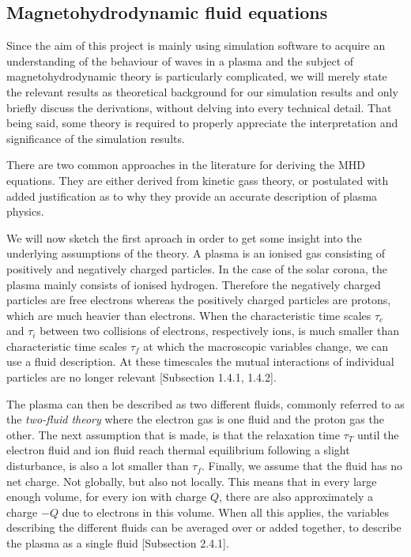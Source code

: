 \subsection{Magnetohydrodynamic fluid equations}
Since the aim of this project is mainly using simulation software to acquire an understanding of the behaviour of waves in a plasma and the subject of magnetohydrodynamic theory is particularly complicated,
we will merely state the relevant results as theoretical background for our simulation results and only briefly discuss the derivations, without delving into every technical detail.
That being said, some theory is required to properly appreciate the interpretation and significance of the simulation results.

There are two common approaches in the literature for deriving the MHD equations. They are either derived from kinetic gass theory, or postulated with added justification as to why they provide an accurate description of plasma physics.

We will now sketch the first aproach in order to get some insight into the underlying assumptions of the theory.
A plasma is an ionised gas consisting of positively and negatively charged particles. In the case of the solar corona, the plasma mainly consists of ionised hydrogen.
Therefore the negatively charged particles are free electrons whereas the positively charged particles are protons, which are much heavier than electrons.
When the characteristic time scales $\tau_e$ and $\tau_i$ between two collisions of electrons, respectively ions, is much smaller than characteristic time scales $\tau_f$ at which the macroscopic variables change, we can use a fluid description. 
At these timescales the mutual interactions of individual particles are no longer relevant \cite{notes-principles-MHD}[Subsection 1.4.1, 1.4.2].

The plasma can then be described as two different fluids, commonly referred to as the \emph{two-fluid theory} where the electron gas is one fluid and the proton gas the other. 
The next assumption that is made, is that the relaxation time $\tau_T$ until the electron fluid and ion fluid reach thermal equilibrium following a slight disturbance, is also a lot smaller than $\tau_f$.
Finally, we assume that the fluid has no net charge. Not globally, but also not locally. 
This means that in every large enough volume, for every ion with charge $Q$, there are also approximately a charge $-Q$ due to electrons in this volume. When all this applies, the variables describing the different fluids can be averaged over or added together, to describe the plasma as a single fluid \cite{notes-principles-MHD}[Subsection 2.4.1].

